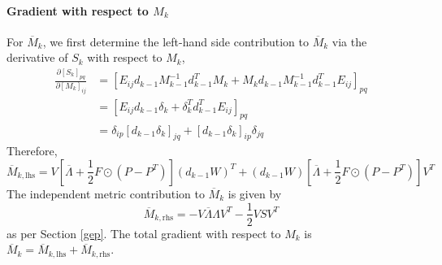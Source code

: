 \documentclass[11pt, a4paper]{article}
\begin{document}
\paragraph{Gradient with respect to $M_k$}
For $\overline{M}_k$, we first determine the left-hand side contribution to $\overline M_k$ via the derivative of $S_k$ with respect to $M_k$,
\begin{equation}
\begin{aligned}
    \frac{\partial [S_k]_{pq}}{\partial [M_k]_{ij}} &= [E_{ij} d_{k-1} M_{k-1}^{-1} d_{k-1}^T M_k + M_k d_{k-1} M_{k-1}^{-1} d_{k-1}^T E_{ij}]_{pq} \\
    &= [E_{ij} d_{k-1} \delta_k + \delta_k^T d_{k-1}^T E_{ij}]_{pq} \\
    &= \delta_{ip}[d_{k-1}\delta_k]_{jq} + [d_{k-1}\delta_k]_{ip}\delta_{jq}
\end{aligned}
\end{equation}
Therefore,
\begin{equation}
\boxed{
    \overline M_{k, \text{lhs}} = V\left[\overline\Lambda + \frac 1 2 F \odot (P - P^T)\right](d_{k-1} W)^T + (d_{k-1} W)\left[\overline\Lambda + \frac 1 2 F \odot (P - P^T)\right]V^T
}
\end{equation}
The independent metric contribution to $\overline M_k$ is given by
\begin{equation}
\boxed{
    \overline M_{k, \text{rhs}} = - V\overline\Lambda\Lambda V^T - \frac 1 2 VSV^T
}
\end{equation}
as per Section \ref{gep}. The total gradient with respect to $M_k$ is $\overline M_k=\overline M_{k,\text{lhs}}+\overline M_{k,\text{rhs}}$. 
\end{document}
